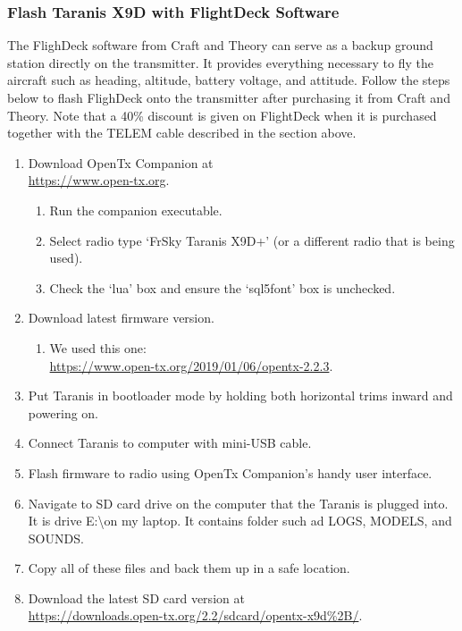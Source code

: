 \documentclass[12pt,journal,compsoc]{IEEEtran}
\begin{document}
\subsubsection{Flash Taranis X9D with FlightDeck Software}
The FlighDeck software from Craft and Theory can serve as a backup ground station directly on the transmitter. It provides everything necessary to fly the aircraft such as heading, altitude, battery voltage, and attitude. Follow the steps below to flash FlighDeck onto the transmitter after purchasing it from Craft and Theory. Note that a 40\% discount is given on FlightDeck when it is purchased together with the TELEM cable described in the section above.
\begin{enumerate}
\item Download OpenTx Companion at\\ \href{https://www.open-tx.org}{https://www.open-tx.org}.
	\begin{enumerate}
	\item Run the companion executable.
	\item Select radio type `FrSky Taranis X9D+' (or a different radio that is being used).
	\item Check the `lua' box and ensure the `sql5font' box is unchecked.
	\end{enumerate}
\item Download latest firmware version.
	\begin{enumerate}
	\item We used this one:\\ \href{https://www.open-tx.org/2019/01/06/opentx-2.2.3}{https://www.open-tx.org/2019/01/06/opentx-2.2.3}.
	\end{enumerate}
\item Put Taranis in bootloader mode by holding both horizontal trims inward and powering on.
\item Connect Taranis to computer with mini-USB cable.
\item Flash firmware to radio using OpenTx Companion's handy user interface.
\item Navigate to SD card drive on the computer that the Taranis is plugged into. It is drive E:\textbackslash on my laptop. It contains folder such ad LOGS, MODELS, and SOUNDS.
\item Copy all of these files and back them up in a safe location.
\item Download the latest SD card version at\\ \href{https://downloads.open-tx.org/2.2/sdcard/opentx-x9d%2B/}{https://downloads.open-tx.org/2.2/sdcard/opentx-x9d\%2B/}. %

\end{enumerate}
\end{document}
